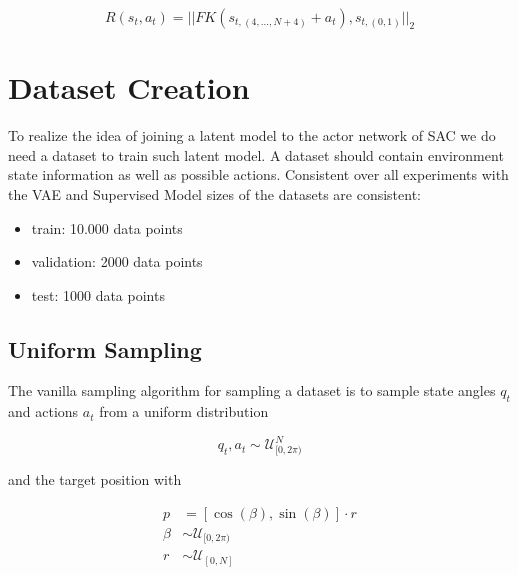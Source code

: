 \begin{equation}\label{eqn:Rewardfunction}
    R(s_t, a_t) = ||FK(s_{t, (4, \ldots, N + 4)}  + a_t), s_{t, (0 ,1)}||_2
\end{equation}

\section{Dataset Creation} \label{sec:Dataset_creation}

To realize the idea of joining a latent model to the actor network of SAC we do need a dataset to train such latent model. A dataset should contain environment state information as well as possible actions.
Consistent over all experiments with the VAE and Supervised Model sizes of the datasets are consistent:
\begin{itemize}
    \item train: 10.000 data points
    \item validation: 2000 data points
    \item test: 1000 data points
\end{itemize}

\subsection{Uniform Sampling} \label{sec:vanilla_sampling}

The vanilla sampling algorithm for sampling a dataset is to sample state angles $q_t$ and actions $a_t$ from a uniform distribution

\begin{equation} \label{eqn:angle_sample}
    q_t, a_t \sim \mathcal{U}_{[0, 2\pi)}^N
\end{equation}

and the target position with

\begin{align}
    p &= [\cos(\beta), \sin(\beta)] \cdot r \label{eqn:position_sample}\\
    \beta &\sim \mathcal{U}_{[0, 2\pi)} \nonumber\\
    r  &\sim \mathcal{U}_{[0, N]} \nonumber
\end{align}

